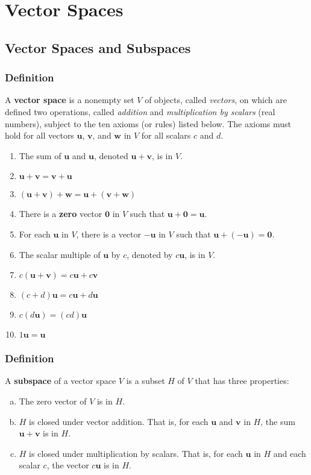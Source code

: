\documentclass[letterpaper,11pt]{article}
\begin{document}
	\section{Vector Spaces}
		\subsection{Vector Spaces and Subspaces}
			\subsubsection{Definition}
				A \textbf{vector space} is a nonempty set $V$ of objects, called \textit{vectors}, on which are defined two operations, called \textit{addition} and \textit{multiplication by scalars} (real numbers), subject to the ten axioms (or rules) listed below. The axioms must hold for all vectors $\mathbf{u}$, $\mathbf{v}$, and $\mathbf{w}$ in $V$ for all scalars $c$ and $d$.
				\begin{enumerate}
					\item The sum of $\mathbf{u}$ and $\mathbf{u}$, denoted $\mathbf{u}+\mathbf{v}$, is in $V$.
					\item $\mathbf{u}+\mathbf{v}=\mathbf{v}+\mathbf{u}$
					\item $(\mathbf{u}+\mathbf{v})+\mathbf{w}=\mathbf{u}+(\mathbf{v}+\mathbf{w})$
					\item There is a \textbf{zero} vector $\mathbf{0}$ in $V$ such that $\mathbf{u}+\mathbf{0}=\mathbf{u}$.
					\item For each $\mathbf{u}$ in $V$, there is a vector $-\mathbf{u}$ in $V$ such that $\mathbf{u}+(-\mathbf{u})=\mathbf{0}$.
					\item The scalar multiple of $\mathbf{u}$ by $c$, denoted by $c\mathbf{u}$, is in $V$.
					\item $c(\mathbf{u}+\mathbf{v})=c\mathbf{u}+c\mathbf{v}$
					\item $(c+d)\mathbf{u}=c\mathbf{u}+d\mathbf{u}$
					\item $c(d\mathbf{u})=(cd)\mathbf{u}$
					\item $1\mathbf{u}=\mathbf{u}$
				\end{enumerate}
			\subsubsection{Definition}
				A \textbf{subspace} of a vector space $V$ is a subset $H$ of $V$ that has three properties:
				\begin{enumerate}[a.]
					\item The zero vector of $V$ is in $H$.
					\item $H$ is closed under vector addition. That is, for each $\mathbf{u}$ and $\mathbf{v}$ in $H$, the sum $\mathbf{u}+\mathbf{v}$ is in $H$.
					\item $H$ is closed under multiplication by scalars. That is, for each $\mathbf{u}$ in $H$ and each scalar $c$, the vector $c\mathbf{u}$ is in $H$.
				\end{enumerate}
\end{document}
